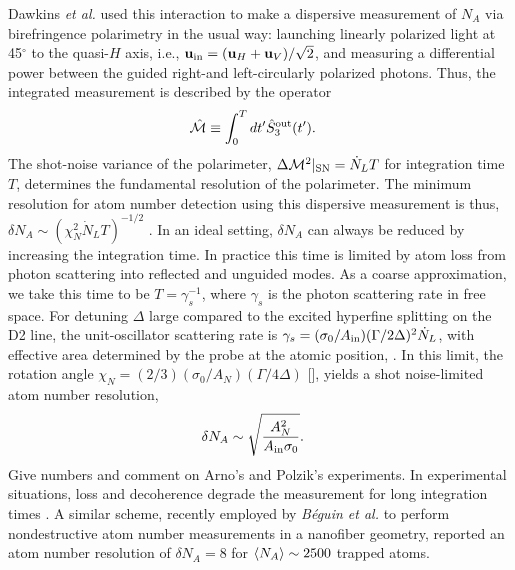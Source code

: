 \documentclass[aps,pra,twocolumn]{revtex4-1} %
\newcommand{\inp}{{\rm in}}
\newcommand{\shotnoise}{\Delta \mathcal{M}^2 |_{\rm SN}}
\newcommand{\chiN}{\chi_{N}}
\newcommand{\Abir}{A_N}
\newcommand{\comment}[1]{{\color{Maroon} #1}}
\begin{document}
Dawkins {\em et al.} \cite{dawkins_dispersive_2011} used this interaction to make a dispersive measurement of $N_A$ via birefringence polarimetry in the usual way: launching linearly polarized light at 45$^\circ$ to the quasi-$H$ axis, i.e., $\mbf{u}_\inp = (\mbf{u}_H + \mbf{u}_V )/\sqrt{2}$, and measuring  a differential power between the guided right-and left-circularly polarized photons. 
Thus, the integrated measurement is described by the operator
\begin{align} \label{Eq::MeasOpAtomCounting}
		\hat{\mathcal{M}} & \equiv \int_0^T dt' \hat{S}^{\rm out}_3(t').
\end{align} 
The shot-noise variance of the polarimeter, $\shotnoise =  \dot{N}_L T$ for integration time $T$,  determines the fundamental resolution of the polarimeter.  
The minimum resolution for atom number detection using this dispersive measurement is thus, $\delta N_A \sim ( \chiN^2 \dot{N}_L T)^{-1/2}$ \cite{smith_faraday_2003}.  
In an ideal setting, $\delta N_A$ can always be reduced by increasing the integration time. In practice this time is limited by atom loss from photon scattering into reflected and unguided modes. 
As a coarse approximation, we take this time to be $T=\gamma_s^{-1}$, where $\gamma_s$ is the photon scattering rate in free space.  
For detuning $\Delta$ large compared to the excited hyperfine splitting on the D2 line, the unit-oscillator scattering rate is $\gamma_s =(\sigma_0 /A_{\rm in})(\Gamma/2 \Delta)^2 \dot{N}_L $, with effective area determined by the probe at the atomic position, .  
In this limit, the rotation angle $\chiN = (2/3) (\sigma_0/\Abir)(\Gamma/4\Delta)$ [], yields a shot noise-limited atom number resolution, 
	\begin{align} \label{Eq::AtomNumberResolution}
		\delta N_A  &\sim \sqrt {\frac{\Abir^2}{A_{\rm in} \sigma_0}}.
	\end{align}
\comment{Give numbers and comment on Arno's and Polzik's experiments.} 
In experimental situations, loss and decoherence degrade the measurement for long integration times \cite{dawkins_dispersive_2011, zhang_collective_2012}. 
A similar scheme, recently employed by \emph{B\'{e}guin et al.} \cite{beguin_generation_2014} to perform nondestructive atom number measurements in a nanofiber geometry,  reported an atom number resolution of $\delta N_A = 8$ for $\langle{N_A}\rangle\sim2500$ trapped atoms.



\end{document}
